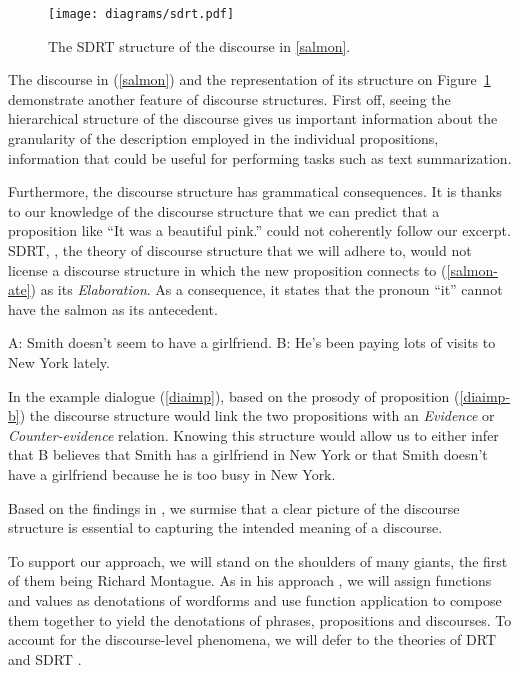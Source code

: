 \begin{figure}
  \centering
  \texttt{[image: diagrams/sdrt.pdf]}
  \caption{\label{fig:sdrt-discourse} The SDRT structure of the
    discourse in \ref{salmon}.}
\end{figure}

The discourse in (\ref{salmon}) and the representation of its structure
on Figure~\ref{fig:sdrt-discourse} demonstrate another feature of
discourse structures. First off, seeing the hierarchical structure of
the discourse gives us important information about the granularity of
the description employed in the individual propositions, information
that could be useful for performing tasks such as text summarization.

Furthermore, the discourse structure has grammatical consequences. It is
thanks to our knowledge of the discourse structure that we can predict
that a proposition like ``It was a beautiful pink.''  could not
coherently follow our excerpt. SDRT, \cite{asher2003logics}, the theory
of discourse structure that we will adhere to, would not license a
discourse structure in which the new proposition connects to
(\ref{salmon-ate}) as its \emph{Elaboration}. As a consequence, it
states that the pronoun ``it'' cannot have the salmon as its antecedent.

\begin{exe}
  \ex \label{diaimp} \begin{xlist}
    \ex A: Smith doesn't seem to have a girlfriend.
    \ex \label{diaimp-b} B: He's been paying lots of visits to New York lately.
  \end{xlist}
\end{exe}

In the example dialogue (\ref{diaimp}), based on the prosody of
proposition (\ref{diaimp-b}) the discourse structure would link the two
propositions with an \emph{Evidence} or \emph{Counter-evidence}
relation. Knowing this structure would allow us to either infer that B
believes that Smith has a girlfriend in New York or that Smith doesn't
have a girlfriend because he is too busy in New York.

Based on the findings in \cite{asher2003logics}, we surmise that a clear
picture of the discourse structure is essential to capturing the
intended meaning of a discourse.

To support our approach, we will stand on the shoulders of many giants,
the first of them being Richard Montague. As in his approach
\cite{montague1973proper}, we will assign functions and values as
denotations of wordforms and use function application to compose them
together to yield the denotations of phrases, propositions and
discourses. To account for the discourse-level phenomena, we will defer
to the theories of DRT \cite{kamp1993discourse} and SDRT
\cite{asher2003logics}.

